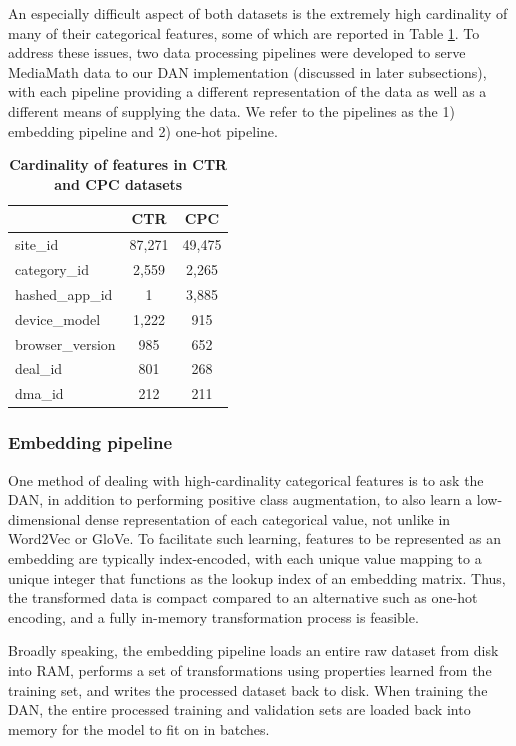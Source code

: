 \documentclass{proc}
\begin{document}
An especially difficult aspect of both datasets is the extremely high cardinality of many of their categorical features, some of which are reported in Table \ref{table:dataset-cardinality}. To address these issues, two data processing pipelines were developed to serve MediaMath data to our DAN implementation (discussed in later subsections), with each pipeline providing a different representation of the data as well as a different means of supplying the data. We refer to the pipelines as the 1) embedding pipeline and 2) one-hot pipeline.

\begin{table}[]
\begin{center}
	\begin{tabular}{|l|c|c|}
		\hline
 		&  \textbf{CTR} & \textbf{CPC}\\ \hline
 		site\_id & 87,271 & 49,475 \\ \hline
 		category\_id & 2,559 & 2,265\\ \hline
		hashed\_app\_id & 1 & 3,885\\ \hline
		device\_model & 1,222 & 915 \\ \hline
		browser\_version & 985 & 652\\ \hline
		deal\_id & 801 & 268\\ \hline
		dma\_id & 212 & 211\\ \hline
	\end{tabular}
	\caption{\textbf{Cardinality of features in CTR and CPC datasets}}
	\label{table:dataset-cardinality}
\end{center}
\end{table}

\subsubsection{Embedding pipeline}
One method of dealing with high-cardinality categorical features is to ask the DAN, in addition to performing positive class augmentation, to also learn a low-dimensional dense representation of each categorical value, not unlike in Word2Vec or GloVe. To facilitate such learning, features to be represented as an embedding are typically index-encoded, with each unique value mapping to a unique integer that functions as the lookup index of an embedding matrix. Thus, the transformed data is compact compared to an alternative such as one-hot encoding, and a fully in-memory transformation process is feasible.

Broadly speaking, the embedding pipeline loads an entire raw dataset from disk into RAM, performs a set of transformations using properties learned from the training set, and writes the processed dataset back to disk. When training the DAN, the entire processed training and validation sets are loaded back into memory for the model to fit on in batches.
\end{document}
